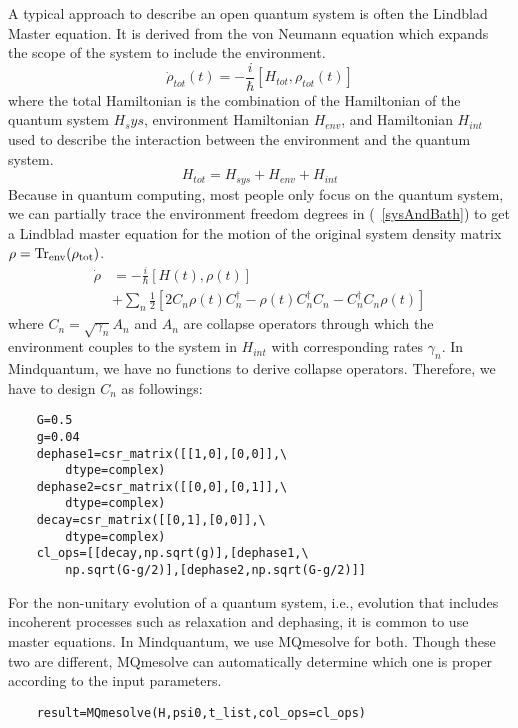 A typical approach to describe an open quantum system is often the Lindblad Master equation. It is derived from the von Neumann equation which expands the scope of the system to include the environment.
\begin{equation}
    \dot{\rho}_{tot}(t)=-\frac{i}{\hbar}\left[H_{tot},\rho_{tot}(t)\right]
    \label{sysAndBath}
\end{equation}
where the total Hamiltonian is the combination of the Hamiltonian of the quantum system $H_sys$, environment Hamiltonian $H_{env}$, and Hamiltonian $H_{int}$ used to describe the interaction between the environment and the quantum system.
\begin{equation}
    H_{tot}=H_{sys}+H_{env}+H_{int}
\end{equation}
Because in quantum computing, most people only focus on the quantum system, we can partially trace the environment freedom degrees in (~\ref{sysAndBath}) to get a Lindblad master equation for the motion of the original system density matrix $\rho=\rm{Tr}_{env}(\rho_{tot})$.
\begin{equation}
\begin{split}
\dot{\rho}&=-\frac{i}{\hbar}\left[H(t),\rho(t)\right]\\
&+\sum_{n}\frac{1}{2}\left[2C_{n}\rho(t)C^{\dagger}_{n}-\rho(t)C_{n}^{\dagger}C_{n}-C_{n}^{\dagger}C_{n}\rho(t)\right]
\end{split}
\end{equation}
where $C_{n}=\sqrt{\gamma_{n}}A_{n}$ and $A_n$ are collapse operators through which the environment couples to the system in $H_{int}$ with corresponding rates $\gamma_{n}$. In Mindquantum, we have no functions to derive collapse operators. Therefore, we have to design $C_{n}$ as followings:
\begin{lstlisting}
    G=0.5
    g=0.04
    dephase1=csr_matrix([[1,0],[0,0]],\
        dtype=complex)
    dephase2=csr_matrix([[0,0],[0,1]],\
        dtype=complex)
    decay=csr_matrix([[0,1],[0,0]],\ 
        dtype=complex)
    cl_ops=[[decay,np.sqrt(g)],[dephase1,\
        np.sqrt(G-g/2)],[dephase2,np.sqrt(G-g/2)]]
\end{lstlisting}
For the non-unitary evolution of a quantum system, i.e., evolution that includes incoherent processes such as relaxation and dephasing, it is common to use master equations. In Mindquantum, we use MQmesolve for both. Though these two are different, MQmesolve can automatically determine which one is proper according to the input parameters.
\begin{lstlisting}
    result=MQmesolve(H,psi0,t_list,col_ops=cl_ops)
\end{lstlisting}

